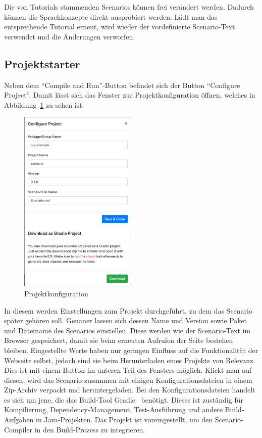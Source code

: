 Die von Tutorials stammenden Scenarios können frei verändert werden.
Dadurch können die Sprachkonzepte direkt ausprobiert werden.
Lädt man das entsprechende Tutorial erneut, wird wieder der vordefinierte Scenario-Text verwendet und die Änderungen verworfen.

\subsection{Projektstarter}\label{subsec:project-starter}

Neben dem ``Compile and Run''-Button befindet sich der Button ``Configure Project''.
Damit lässt sich das Fenster zur Projektkonfiguration öffnen, welches in Abbildung~\ref{fig:project-config} zu sehen ist.

\begin{figure}
    \centering
    \includegraphics[width=0.5\textwidth]{chapter/fulib.org/img/project-config.png}
    \caption{Projektkonfiguration}
    \label{fig:project-config}
\end{figure}

In diesem werden Einstellungen zum Projekt durchgeführt, zu dem das Scenario später gehören soll.
Genauer lassen sich dessen Name und Version sowie Paket und Dateiname des Scenarios einstellen.
Diese werden wie der Scenario-Text im Browser gespeichert, damit sie beim erneuten Aufrufen der Seite bestehen bleiben.
Eingestellte Werte haben nur geringen Einfluss auf die Funktionalität der Webseite selbst,
jedoch sind sie beim Herunterladen eines Projekts von Relevanz.
Dies ist mit einem Button im unteren Teil des Fensters möglich.
Klickt man auf diesen, wird das Scenario zusammen mit einigen Konfigurationsdateien in einem Zip-Archiv verpackt und heruntergeladen.
Bei den Konfigurationsdateien handelt es sich um jene, die das Build-Tool Gradle~\cite{gradle} benötigt.
Dieses ist zuständig für Kompilierung, Dependency-Management, Test-Ausführung und andere Build-Aufgaben in Java-Projekten.
Das Projekt ist voreingestellt, um den Scenario-Compiler in den Build-Prozess zu integrieren.

